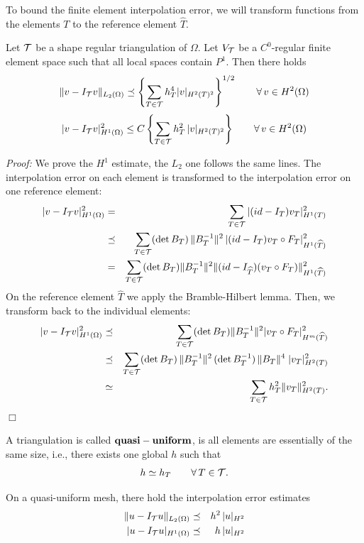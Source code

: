 To bound the finite element interpolation error, we will transform
functions from the elements $T$ to the reference element $\widehat T$.

\begin{theorem} Let ${\cal T}$ be a shape regular triangulation of $\Omega$.
Let $V_{\cal T}$ be a $C^0$-regular finite element space such that all local spaces contain $P^1$. Then there holds
$$
\| v - I_{\cal T} v \|_{L_2(\Omega)} \preceq  \left\{ \sum_{T \in {\cal T}} h_T^4 | v |_{H^2(T)^2} \right\}^{1/2} \qquad \forall \, v \in H^2(\Omega)
$$
$$
| v - I_{\cal T} v |_{H^1(\Omega)}^2 \leq 
C \left\{ \sum_{T \in {\cal T}} h_T^2  \, | v |_{H^2(T)^2} \right\} \qquad \forall \, v \in H^2(\Omega)
$$
\end{theorem}

{\em Proof:} We prove the $H^1$ estimate, the $L_2$ one follows the same lines. The interpolation error on each element is transformed to the interpolation error on one reference element:
\begin{eqnarray*}
| v - I_{\cal T} v |_{H^1(\Omega)}^2 & = & 
        \sum_{T \in {\cal T}} | (id - I_T) v_T |_{H^1(T)}^2 \\
        & \preceq & \sum_{T \in {\cal T}} (\det B_T) \, \| B_T^{-1} \|^2 \, | (id - I_T) v_T \circ F_T |_{H^1(\widehat T)}^2  \\
        & = & \sum_{T \in {\cal T}} (\det B_T) \| B_T^{-1}  \|^2 \| (id - I_{\widehat T}) (v_T \circ F_T) \| _{H^1 (\widehat T)}^2
\end{eqnarray*}
On the reference element $\widehat T$ we apply the Bramble-Hilbert lemma.
Then, we transform back to the individual elements:
\begin{eqnarray*}
| v - I_{\cal T} v |_{H^1(\Omega)}^2 & \preceq & 
        \sum_{T \in {\cal T}} (\det B_T) \| B_T^{-1}  \|^2 | v_T \circ F_T | _{H^m (\widehat T)}^2 \\
  & \preceq &  \sum_{T \in {\cal T}} (\det B_T) \, \| B_T^{-1} \|^2 \, (\det B_T^{-1}) \, \| B_T \|^4  \; | v_T |_{H^2 (T)}^2 \\
        & \simeq & \sum_{T \in {\cal T}} h_T^2 \| v_T \|_{H^2 (T)}^2.
\end{eqnarray*}
\hfill $\Box$


\bigskip

A triangulation is called ${\bf quasi-uniform}$, is all elements are essentially of the
same size, i.e., there exists one global $h$ such that
$$
h \simeq h_T \qquad \forall \, T \in {\cal T}.
$$


On a quasi-uniform mesh, there hold the interpolation error estimates
\begin{eqnarray*}
\| u - I_{\cal T} u \|_{L_2(\Omega)} & \preceq & h^2 \, | u |_{H^2} \\
| u - I_{\cal T} u |_{H^1(\Omega)} & \preceq & h \, | u |_{H^2} 
\end{eqnarray*}


